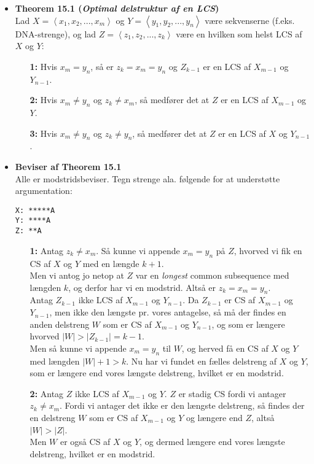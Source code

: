 \begin{itemize}
\item \textbf{Theorem 15.1 (\textit{Optimal delstruktur af en LCS})}\\
Lad $X = \left<x_1, x_2, ..., x_m\right>$ og $Y = \left<y_1, y_2, ..., y_n\right>$ være sekvenserne (f.eks. DNA-strenge), og lad $Z = \left<z_1, z_2, ..., z_k\right>$ være en hvilken som helst LCS af $X$ og $Y$:
\begin{enumerate}
	\item[\textbf{1:}] Hvis $x_m = y_n$, så er $z_k = x_m = y_n$ og $Z_{k-1}$ er en LCS af $X_{m-1}$ og $Y_{n-1}$.
	\item[\textbf{2:}] Hvis $x_m \neq y_n$ og $z_k \neq x_m$, så medfører det at $Z$ er en LCS af $X_{m-1}$ og $Y$.
	\item[\textbf{3:}] Hvis $x_m \neq y_n$ og $z_k \neq y_n$, så medfører det at $Z$ er en LCS af $X$ og $Y_{n-1}$.
\end{enumerate}\vspace{1em}


\item \textbf{Beviser af Theorem 15.1}\\
Alle er modstridsbeviser. Tegn strenge ala. følgende for at understøtte argumentation:
\begin{verbatim}
X: *****A
Y: ****A
Z: **A
\end{verbatim}

\begin{enumerate}
	\item[\textbf{1:}]
	Antag $z_k \neq x_m$. Så kunne vi appende $x_m = y_n$ på $Z$, hvorved vi fik en CS af $X$ og $Y$ med en længde $k+1$.\\
	Men vi antog jo netop at $Z$ var en \textit{longest} common subsequence med længden $k$, og derfor har vi en modstrid. Altså er $z_k = x_m = y_n$.\\
	
	Antag $Z_{k-1}$ ikke LCS af $X_{m-1}$ og $Y_{n-1}$. Da $Z_{k-1}$ er CS af $X_{m-1}$ og $Y_{n-1}$, men ikke den længste pr. vores antagelse, så må der findes en anden delstreng $W$ som er CS af $X_{m-1}$ og $Y_{n-1}$, og som er længere hvorved $|W| > |Z_{k-1}| = k-1$.\\
	Men så kunne vi appende $x_m = y_n$ til $W$, og herved få en CS af $X$ og $Y$ med længden $|W| + 1 > k$. Nu har vi fundet en fælles delstreng af $X$ og $Y$, som er længere end vores længste delstreng, hvilket er en modstrid.\\
	
	
	\item[\textbf{2:}]
	Antag $Z$ ikke LCS af $X_{m-1}$ og $Y$. $Z$ er stadig CS fordi vi antager $z_k \neq x_m$. Fordi vi antager det ikke er den længste delstreng, så findes der en delstreng $W$ som er CS af $X_{m-1}$ og $Y$ og længere end $Z$, altså $|W| > |Z|$.\\
	Men $W$ er også CS af $X$ og $Y$, og dermed længere end vores længste delstreng, hvilket er en modstrid.\\
	

\end{enumerate}
\end{itemize}
